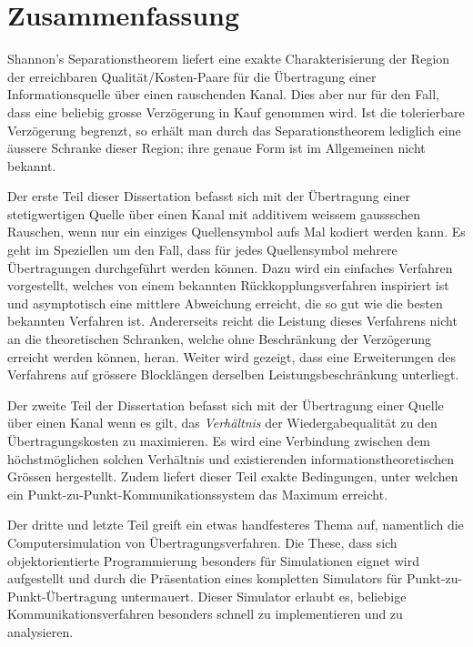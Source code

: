 \chapter*{Zusammenfassung}

Shannon's Separationstheorem liefert eine exakte Charakterisierung der Region
der erreichbaren Qualität/Kosten-Paare für die Übertragung einer
Informationsquelle über einen rauschenden Kanal. Dies aber nur für den Fall,
dass eine beliebig grosse Verzögerung in Kauf genommen wird. Ist die
tolerierbare Verzögerung begrenzt, so erhält man durch das Separationstheorem
lediglich eine äussere Schranke dieser Region; ihre genaue Form ist im
Allgemeinen nicht bekannt. 

Der erste Teil dieser Dissertation befasst sich mit der Übertragung einer
stetigwertigen Quelle über einen Kanal mit additivem weissem gaussschen
Rauschen, wenn nur ein einziges Quellensymbol aufs Mal kodiert werden kann. Es
geht im Speziellen um den Fall, dass für jedes Quellensymbol mehrere
Übertragungen durchgeführt werden können. Dazu wird ein einfaches Verfahren
vorgestellt, welches von einem bekannten Rückkopplungsverfahren inspiriert ist
und asymptotisch eine mittlere Abweichung erreicht, die so gut wie die besten
bekannten Verfahren ist. Andererseits reicht die Leistung dieses Verfahrens
nicht an die theoretischen Schranken, welche ohne Beschränkung der Verzögerung
erreicht werden können, heran. Weiter wird gezeigt, dass eine Erweiterungen des
Verfahrens auf grössere Blocklängen derselben Leistungsbeschränkung unterliegt.

Der zweite Teil der Dissertation befasst sich mit der Übertragung einer Quelle
über einen Kanal wenn es gilt, das \emph{Verhältnis} der Wiedergabequalität zu
den Übertragungskosten zu maximieren. Es wird eine Verbindung zwischen dem
höchstmöglichen solchen Verhältnis und existierenden informationstheoretischen
Grössen hergestellt. Zudem liefert dieser Teil exakte Bedingungen, unter welchen
ein Punkt-zu-Punkt-Kommunikationssystem das Maximum erreicht. 

Der dritte und letzte Teil greift ein etwas handfesteres Thema auf, namentlich
die Computersimulation von Übertragungsverfahren. Die These, dass sich
objektorientierte Programmierung besonders für Simulationen eignet wird
aufgestellt und durch die Präsentation eines kompletten Simulators für
Punkt-zu-Punkt-Übertragung untermauert. Dieser Simulator erlaubt es, beliebige
Kommunikationsverfahren besonders schnell zu implementieren und zu analysieren. 

